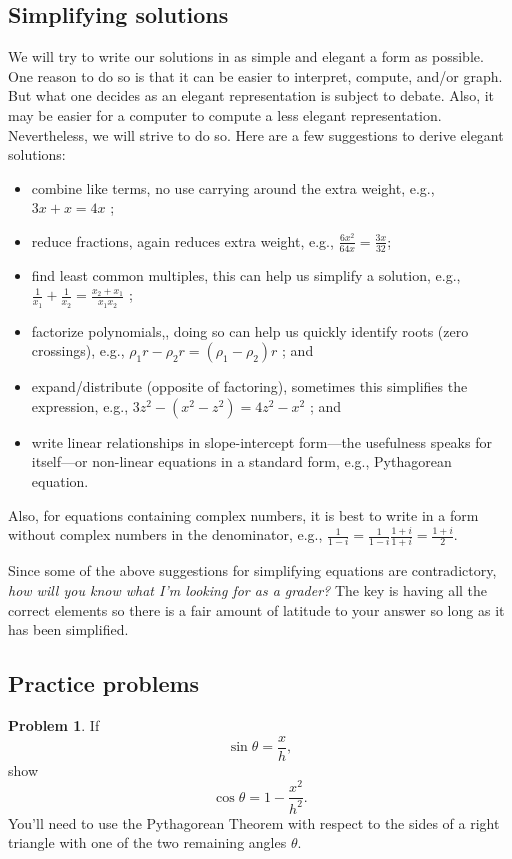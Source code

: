 \documentclass[final,a4paper,12pt]{article}
\theoremstyle{definition}
\newtheorem{problem}{Problem}[section]
\begin{document}
\subsection{Simplifying solutions}
We will try to write our solutions in as simple and elegant a form as possible.
One reason to do so is that it can be easier to interpret, compute, and/or graph.
But what one decides as an elegant representation is subject to debate.  Also,
it may be easier for a computer to compute a less elegant representation.
Nevertheless, we will strive to do so.  Here are a few suggestions to derive
elegant solutions:
\begin{itemize}
    \item combine like terms, no use carrying around the
    extra weight, e.g., $3x + x = 4x$ ;

    \item reduce fractions, again
    reduces extra weight, e.g., $\frac{6x^2}{64x} = \frac{3x}{32}$;

    \item find least common multiples, this can help us simplify a solution,
    e.g., $\frac{1}{x_1} + \frac{1}{x_2} = \frac{x_2 + x_1}{x_1 x_2}$ ;

    \item factorize polynomials,, doing so can help us quickly identify roots
    (zero crossings),  e.g., $\rho_1 r - \rho_2 r = (\rho_1 - \rho_2) r$ ; and

    \item expand/distribute (opposite of factoring), sometimes this simplifies
    the expression, e.g., $3z^2 - (x^2 - z^2) = 4z^2 - x^2$ ; and

    \item write linear relationships in slope-intercept form---the usefulness
    speaks for itself---or non-linear equations in a standard form, e.g.,
    Pythagorean equation.
\end{itemize}
Also, for equations containing complex numbers, it is best to write in a form
without complex numbers in the denominator, e.g., $\frac{1}{1 - i} = \frac{1}{1
- i}\frac{1 + i}{1 + i} = \frac{1 + i}{2}$.

Since some of the above suggestions for simplifying equations are contradictory,
{\it how will you know what I'm looking for as a grader?}  The key is having all
the correct elements so there is a fair amount of latitude to your answer so
long as it has been simplified.


\subsection{Practice problems}
\begin{problem}
    If
    \begin{equation*}
        \sin \theta = \frac{x}{h},
    \end{equation*}
    show
    \begin{equation*}
        \cos \theta = 1 - \frac{x^2}{h^2}.
    \end{equation*}
    You'll need to use the Pythagorean Theorem with respect to the sides of a
    right triangle with one of the two remaining angles $\theta$.
\end{problem}
\end{document}
